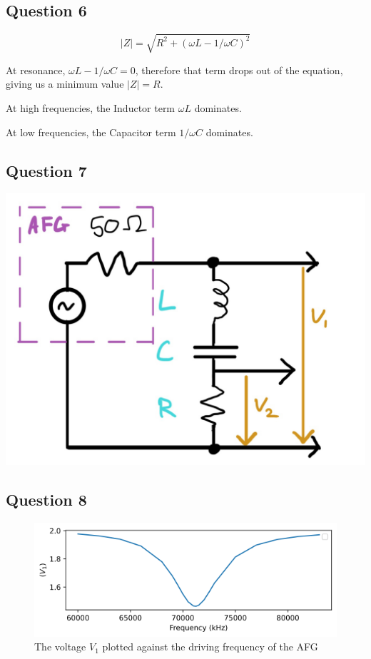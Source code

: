 \documentclass[a4paper]{article}
\begin{document}
\subsection{Question 6}
\begin{equation}
|Z|=\sqrt{R^2+(\omega L-1/\omega C)^2}
\end{equation}

At resonance, $\omega L-1/\omega C=0$, therefore that term drops out of the equation, giving us a minimum value $|Z|=R$.

At high frequencies, the Inductor term $\omega L$ dominates.

At low frequencies, the Capacitor term $1/\omega C$ dominates.

\subsection{Question 7}
\includegraphics[scale=0.2]{circuit.png}

\subsection{Question 8}
\begin{figure}[h]
\includegraphics[scale=0.8]{v1.png}
\caption{The voltage $V_1$ plotted against the driving frequency of the AFG}
\end{figure}
\end{document}
